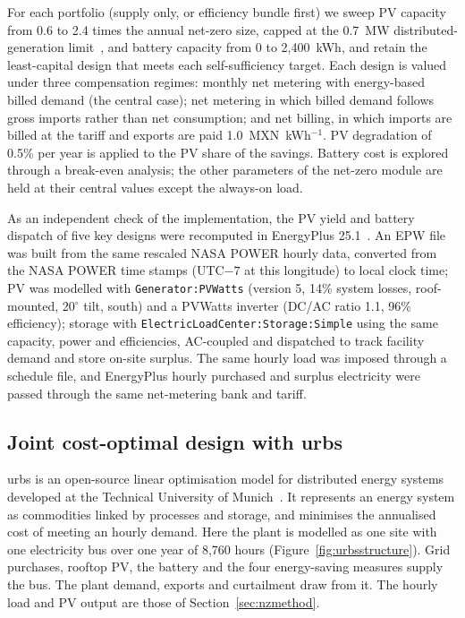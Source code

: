 \documentclass[processes,article,submit,pdftex,moreauthors]{Definitions/mdpi}
\newcommand{\MXN}{MXN}
\begin{document}
For each portfolio (supply only, or efficiency bundle first) we sweep PV capacity from 0.6 to 2.4 times the annual net-zero size, capped at the 0.7~MW distributed-generation limit~\cite{lse2025}, and battery capacity from 0 to 2,400~kWh, and retain the least-capital design that meets each self-sufficiency target. Each design is valued under three compensation regimes: monthly net metering with energy-based billed demand (the central case); net metering in which billed demand follows gross imports rather than net consumption; and net billing, in which imports are billed at the tariff and exports are paid 1.0~\MXN~kWh$^{-1}$. PV degradation of 0.5\% per year is applied to the PV share of the savings. Battery cost is explored through a break-even analysis; the other parameters of the net-zero module are held at their central values except the always-on load.

As an independent check of the implementation, the PV yield and battery dispatch of five key designs were recomputed in EnergyPlus 25.1~\cite{crawley2001}. An EPW file was built from the same rescaled NASA POWER hourly data, converted from the NASA POWER time stamps (UTC$-7$ at this longitude) to local clock time; PV was modelled with \texttt{Generator:\allowbreak{}PVWatts} (version 5, 14\% system losses, roof-mounted, 20$^\circ$ tilt, south) and a PVWatts inverter (DC/AC ratio 1.1, 96\% efficiency); storage with \texttt{ElectricLoadCenter:\allowbreak{}Storage:\allowbreak{}Simple} using the same capacity, power and efficiencies, AC-coupled and dispatched to track facility demand and store on-site surplus. The same hourly load was imposed through a schedule file, and EnergyPlus hourly purchased and surplus electricity were passed through the same net-metering bank and tariff.

\subsection{Joint cost-optimal design with urbs}
\label{sec:urbsmethod}
urbs is an open-source linear optimisation model for distributed energy systems developed at the Technical University of Munich~\cite{urbs}. It represents an energy system as commodities linked by processes and storage, and minimises the annualised cost of meeting an hourly demand. Here the plant is modelled as one site with one electricity bus over one year of 8,760 hours (Figure~\ref{fig:urbsstructure}). Grid purchases, rooftop PV, the battery and the four energy-saving measures supply the bus. The plant demand, exports and curtailment draw from it. The hourly load and PV output are those of Section~\ref{sec:nzmethod}.
\end{document}
